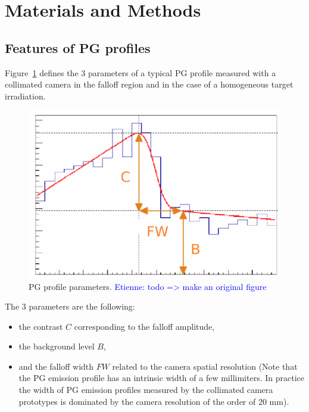 \documentclass[a4paper,english]{article}
\newcommand{\tcb}[1]{\textcolor{blue}{#1}}
\begin{document}

\section{Materials and Methods}


\subsection{Features of PG profiles}


Figure~\ref{ProfileParameters} defines the 3 parameters of a typical PG profile measured with a collimated camera in the falloff region and in the case of a homogeneous target irradiation.

\begin{figure}[htp]
  \centering
  \includegraphics[width=.45\textwidth]{ProfileParameters}
	\caption{\label{ProfileParameters} PG profile parameters. \tcb{Etienne: todo => make an original figure}}
\end{figure} 

The 3 parameters are the following:
\begin{itemize}
  \item the contrast $C$ corresponding to the falloff amplitude,
  \item the background level $B$,
  \item and the falloff width $FW$ related to the camera spatial resolution (Note that the PG emission profile has an intrinsic width of a few millimiters. In practice the width of PG emission profiles measured by the collimated camera prototypes is dominated by the camera resolution of the order of 20 mm).
\end{itemize}
\end{document}
